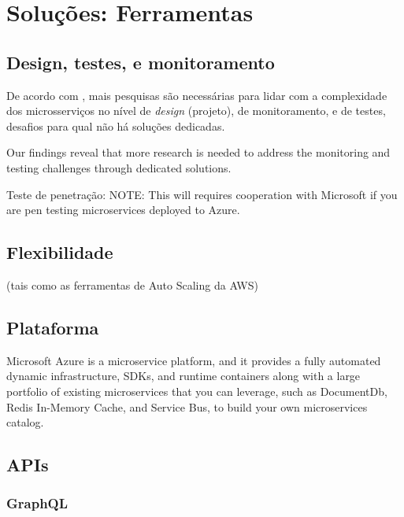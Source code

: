 \chapter{Soluções: Ferramentas}\label{chapter-solucoes}


\section{Design, testes, e monitoramento}

De acordo com , mais pesquisas são necessárias para lidar com a complexidade dos microsserviços no nível de \emph{design} (projeto), de monitoramento, e de testes, desafios para qual não há soluções dedicadas.

Our findings reveal that more research is needed to address the monitoring and testing challenges through dedicated solutions. \cite{design-monitoring-testing-waseem}

Teste de penetração: NOTE: This will requires cooperation with Microsoft if you are pen testing microservices deployed to Azure.

\section{Flexibilidade}
(tais como as ferramentas de Auto Scaling da AWS)

\section{Plataforma}
Microsoft Azure is a microservice platform, and it provides a fully automated dynamic infrastructure, SDKs, and runtime containers along with a large portfolio of existing microservices that you can leverage, such as DocumentDb, Redis In-Memory Cache, and Service Bus, to build your own microservices catalog. \cite{Familiar2015}

\section{APIs}

\subsection{GraphQL}

